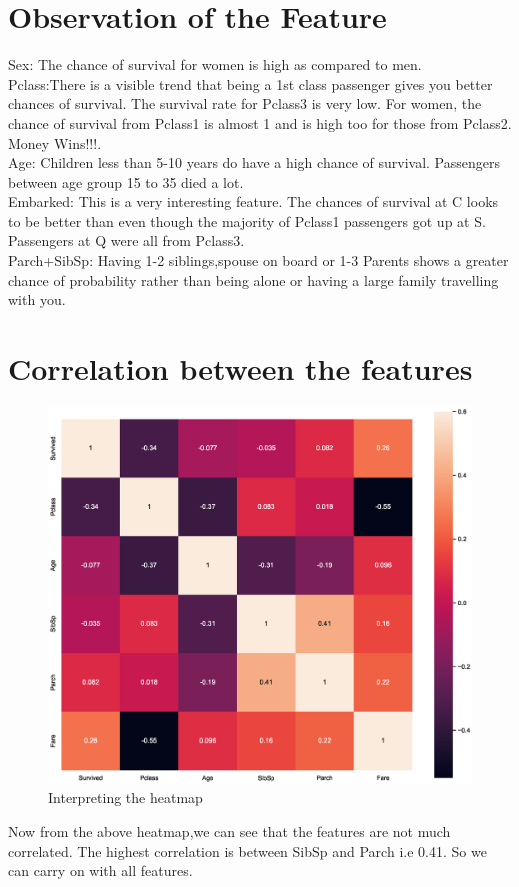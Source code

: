 \section{Observation of the Feature} \label{sec-analysis}
Sex: The chance of survival for women is high as compared to men.\\
  Pclass:There is a visible trend that being a 1st class passenger gives you better chances of survival. The survival rate for Pclass3 is very low. For women, the chance of survival from Pclass1 is almost 1 and is high too for those from Pclass2. Money Wins!!!.\\
  Age: Children less than 5-10 years do have a high chance of survival. Passengers between age group 15 to 35 died a lot.\\
  Embarked: This is a very interesting feature. The chances of survival at C looks to be better than even though the majority of Pclass1 passengers got up at S. Passengers at Q were all from Pclass3.\\
  Parch+SibSp: Having 1-2 siblings,spouse on board or 1-3 Parents shows a greater chance of probability rather than being alone or having a large family travelling with you.

\section{Correlation between the features} \label{sec-experiment}
\begin{figure}
  \centering
  \centerline{\includegraphics[width=1.0\textwidth,height=0.5\textwidth]{./graphics/titanicimg/heatmap.eps}}
  \caption{Interpreting the heatmap}\label{fig:Heat map}
\end{figure}
Now from the above heatmap,we can see that the features are not much correlated. The highest correlation is between SibSp and Parch i.e 0.41. So we can carry on with all features.
